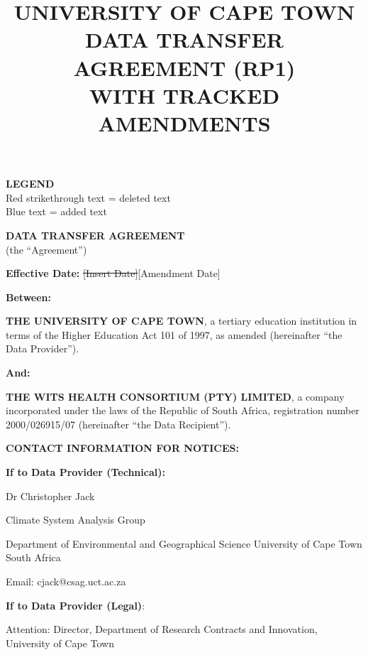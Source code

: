 \documentclass[12pt,letterpaper]{article}
\title{\textbf{UNIVERSITY OF CAPE TOWN\\DATA TRANSFER AGREEMENT (RP1)\\WITH TRACKED AMENDMENTS}}
\author{}
\date{}
\newcommand{\deleted}[1]{\textcolor{deletecolor}{\sout{#1}}}
\newcommand{\added}[1]{\textcolor{addcolor}{#1}}
\begin{document}
\maketitle

\begin{center}
\textbf{LEGEND}\\
\textcolor{deletecolor}{Red strikethrough text} = deleted text\\
\textcolor{addcolor}{Blue text} = added text
\end{center}

\vspace{1cm}

\begin{center}
\textbf{\Large DATA TRANSFER AGREEMENT}\\
\vspace{0.5cm}
(the ``Agreement'')
\end{center}

\vspace{0.5cm}

\textbf{Effective Date:} \deleted{[Insert Date]}\added{[Amendment Date]}

\textbf{Between:}

\textbf{THE UNIVERSITY OF CAPE TOWN}, a tertiary education institution in terms of the Higher Education Act 101 of 1997, as amended (hereinafter ``the Data Provider'').

\vspace{0.2cm}

\textbf{And:}

\textbf{THE WITS HEALTH CONSORTIUM (PTY) LIMITED}, a company incorporated under the laws of the Republic of South Africa, registration number 2000/026915/07 (hereinafter ``the Data Recipient'').

\vspace{0.5cm}

\textbf{CONTACT INFORMATION FOR NOTICES:}

\textbf{If to Data Provider (Technical):}

Dr Christopher Jack

Climate System Analysis Group

Department of Environmental and Geographical Science University of Cape Town South Africa

Email: cjack@csag.uct.ac.za

\textbf{If to Data Provider (Legal)}:

Attention: Director, Department of Research Contracts and Innovation, University of Cape Town
\end{document}
